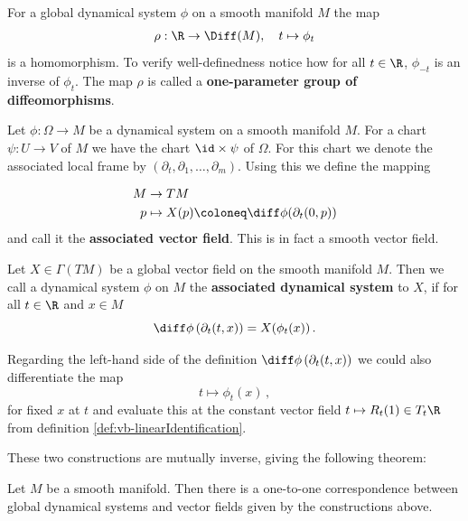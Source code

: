 \begin{corollary}
	For a global dynamical system $\phi$ on a smooth manifold $M$ the map
	\begin{align*}
		\rho: \R \to \Diff(M),\quad t\mapsto \phi_t
	\end{align*}is a homomorphism. To verify well-definedness notice how for all $t\in \R$, $\phi_{-t}$ is an inverse of $\phi_t$. The map $\rho$ is called a \textbf{one-parameter group of diffeomorphisms}.
\end{corollary}
\begin{definition}
	Let $\phi: \Omega \to M$ be a dynamical system on a smooth manifold $M$. For a chart $\psi:U\to V$ of $M$ we have the chart $\id\times \psi$ of $\Omega$. For this chart we denote the associated local frame by $(\partial_t,\partial_1,\dots, \partial_m)$.  Using this we define the mapping
	
	\begin{align*}
		M &\to TM\\
		p& \mapsto X(p)\coloneq \diff \phi (\partial_t(0,p))
	\end{align*} and call it the \textbf{associated vector field}. This is in fact a smooth vector field. 
\end{definition}
\begin{definition}
	Let $X\in \Gamma(TM)$ be a global vector field on the smooth manifold $M$. Then we call a dynamical system $\phi$ on $M$ the \textbf{associated dynamical system} to $X$, if for all $t\in \R$ and $x\in M$ 
	\begin{equation*}
		\diff \phi \left(\partial_t(t,x )\right)=X(\phi_{t}(x))\,.
	\end{equation*} 
\end{definition}
\begin{remark}
	Regarding the left-hand side of the definition $\diff \phi \left(\partial_t(t,x )\right)$ we could also differentiate the map 
	\begin{equation*}
		t \mapsto \phi_t(x)\,,
	\end{equation*} for fixed $x$ at $t$ and evaluate this at the constant vector field $t\mapsto R_t(1)\in T_t \R$ from definition \ref{def:vb-linearIdentification}. 
\end{remark}
These two constructions are mutually inverse, giving the following theorem:
\begin{theorem}
	Let $M$ be a smooth manifold. Then there is a one-to-one correspondence between global dynamical systems and vector fields given by the constructions above.
\end{theorem}

